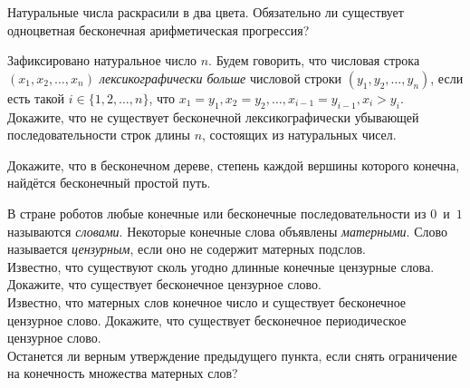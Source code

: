 \resetproblem \begingroup %
    \def\jeolmdate{5 июня 2018 г., пара 1}%
    \def\jeolmgroupname{Группа 9-1}%
    \def\jeolmauthors{Афризонов Д., Кушнир А., Тихонов~Ю.}%
\jeolmheader \endgroup


\begin{problems}

\item Натуральные числа раскрасили в два цвета. Обязательно ли существует одноцветная бесконечная арифметическая прогрессия? 

\item Зафиксировано натуральное число $n$. Будем говорить, что числовая строка $(x_1, x_2, \ldots, x_n)$ \emph{лексикографически больше} числовой строки $(y_1, y_2, \ldots, y_n)$, если есть такой $i \in \{ 1, 2, \ldots, n \}$, что $x_1 = y_1, x_2 = y_2, \ldots, x_{i - 1} = y_{i - 1}, x_i > y_i$.  Докажите, что не существует бесконечной лексикографически убывающей последовательности строк длины $n$, состоящих из натуральных чисел.


\item {} Докажите, что в бесконечном дереве, степень каждой вершины которого конечна, найдётся бесконечный простой путь.

\item В стране роботов любые конечные или бесконечные последовательности из $0$~и~$1$ называются \emph{словами}. Некоторые конечные слова объявлены \emph{матерными}. Слово называется \emph{цензурным}, если оно не содержит матерных подслов.\\
\subproblem Известно, что существуют сколь угодно длинные конечные цензурные слова. Докажите, что существует бесконечное цензурное слово.\\
\subproblem Известно, что матерных слов конечное число и существует бесконечное цензурное слово. Докажите, что существует бесконечное периодическое цензурное слово.\\
\subproblem Останется ли верным утверждение предыдущего пункта, если снять ограничение на конечность множества матерных слов?


\end{problems}
